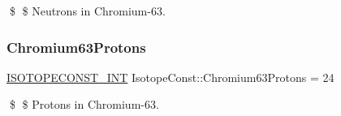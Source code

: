\$ \$ Neutrons in Chromium-\/63. \mbox{\label{group___isotope_const-_chromium-_cr63_ga82f38e25b2a972955fb08df943a3ef7b}} 
\subsubsection{\texorpdfstring{Chromium63\+Protons}{Chromium63Protons}}
{\footnotesize\ttfamily \mbox{\hyperlink{group___isotope_const-_macros_ga5f18360b3e99483a35c32d789e62621c}{I\+S\+O\+T\+O\+P\+E\+C\+O\+N\+S\+T\+\_\+\+I\+NT}} Isotope\+Const\+::\+Chromium63\+Protons = 24}

\$ \$ Protons in Chromium-\/63. 